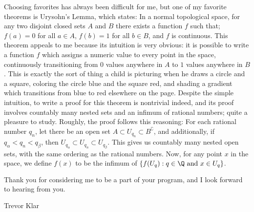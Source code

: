 \documentclass[letterpaper, 12pt]{article}
\theoremstyle{definition}%
\numberwithin{exercise}{section}
\theoremstyle{remark}%
\begin{document}
Choosing favorites has always been difficult for me, but one of my favorite theorems is Urysohn's Lemma, which states: In a normal topological space, for any two disjoint closed sets $A$ and $B$ there exists a function $f$ such that; $f(a)=0$ for all $a\in A$, $f(b)=1$ for all $b\in B$, and $f$ is continuous. This theorem appeals to me because its intuition is very obvious: it is possible to write a function $f$ which assigns a numeric value to every point in the space, continuously transitioning from $0$ values anywhere in $A$ to $1$ values anywhere in $B$. This is exactly the sort of thing a child is picturing when he draws a circle and a square, coloring the circle blue and the square red, and shading a gradient which transitions from blue to red elsewhere on the page. Despite the simple intuition, to write a proof for this theorem is nontrivial indeed, and its proof involves countably many nested sets and an infimum of rational numbers; quite a pleasure to study. Roughly, the proof follows this reasoning: For each rational number $q_n$, let there be an open set $A \subset U_{q_n} \subset B^\complement$, and additionally, if $q_\alpha<q_n<q_\beta$, then $U_{q_\alpha}\subset U_{q_n} \subset U_{q_\beta}$. This gives us countably many nested open sets, with the same ordering as the rational numbers. Now, for any point $x$ in the space, we define $f(x)$ to be the infimum of $\{f(U_q) : q\in\Q \text{ and } x\in U_q \}$. 

\mbox{}

Thank you for considering me to be a part of your program, and I look forward to hearing from you. 

\mbox{}

Trevor Klar
\end{document}
